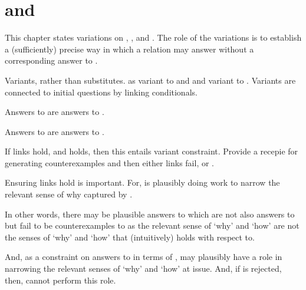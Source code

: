 \chapter{\qWhyV{} and \qHowV{}}
\label{cha:var}

\begin{note}
  This chapter states variations on \qWhy{}, \qHow{}, and \issueInclusion{}.
  The role of the variations is to establish a (sufficiently) precise way in which a relation may answer \qWhy{} without a corresponding answer to \qHow{}.

  Variants, rather than substitutes.
  \qWhyV{} as variant to \qWhy{} and \qHowV{} and variant to \qHow{}.
  Variants are connected to initial questions by linking conditionals.

  \begin{TOCEnum}
  \item

    Answers to \qWhyV{} are answers to \qWhy{}.
  \item

    Answers to \qHow{} are answers to \qHowV{}.
  \item

    If links hold, and \issueConstraint{} holds, then this entails variant constraint.
  Provide a recepie for generating counterexamples and then either links fail, or \issueConstraint{}.
  \end{TOCEnum}
\end{note}

\begin{note}
  Ensuring links hold is important.
  For, \issueInclusion{} is plausibly doing work to narrow the relevant sense of why captured by \qWhy{}.

  In other words, there may be plausible answers to \qWhy{} which are not also answers to \qHow{} but fail to be counterexamples to \issueInclusion{} as the relevant sense of `why' and `how' are not the senses of `why' and `how' that \issueInclusion{} (intuitively) holds with respect to.

  And, as a constraint on answers to \qWhy{} in terms of \qHow{}, \issueInclusion{} may plausibly have a role in narrowing the relevant senses of `why' and `how' at issue.
  And, if \issueInclusion{} is rejected, then, \issueInclusion{} cannot perform this role.
\end{note}

\section{\qWhyV{}}
\label{cha:var:qwhyvnp}

